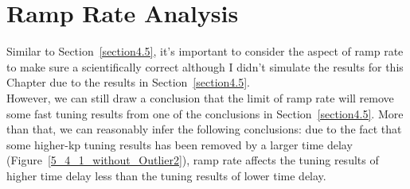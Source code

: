 \section{Ramp Rate Analysis} %
\label{section5.5}
Similar to Section~\ref{section4.5}, it's important to consider the aspect of ramp rate to make sure a scientifically correct although I didn't simulate the results for this Chapter due to the results in Section~\ref{section4.5}. \\

However, we can still draw a conclusion that the limit of ramp rate will remove some fast tuning results from one of the conclusions in Section~\ref{section4.5}. More than that, we can reasonably infer the following conclusions: due to the fact that some higher-kp tuning results has been removed by a larger time delay (Figure~\ref{5_4_1_without_Outlier2}), ramp rate affects the tuning results of higher time delay less than the tuning results of lower time delay.